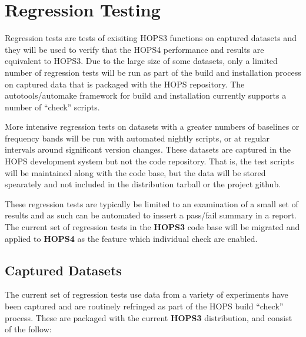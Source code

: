 %
\section{Regression Testing}
\label{sec:regress}

Regression tests are tests of exisiting HOPS3 functions on captured datasets and they will be used to verify that the HOPS4 performance and results are equivalent to HOPS3.  Due to the large size of some datasets, only a limited number of regression tests will be run as part of the build and installation process on captured data that is packaged with the HOPS repository.  The autotools/automake framework for build and installation currently supports a number of ``check'' scripts.

More intensive regression tests on datasets with a greater numbers of baselines or frequency bands will  be run with automated nightly scripts, or at regular intervals around significant version changes. These datasets are captured in the \ac{HOPS} development system but not the code repository.  That is, the test scripts will be maintained along with the code base, but the data will be stored spearately and not included in the distribution tarball or the project github.

These regression tests are typically be limited to an examination of a small set of results and as such can be automated to inssert a pass/fail summary in a report.
The current set of regression tests in the \textbf{HOPS3} code base will be migrated and applied to \textbf{HOPS4} as the feature which individual check are enabled. 



\subsection{Captured Datasets}
\label{sec:captdatareq}

The current set of regression tests use data from a variety of experiments have been captured and are routinely refringed as part of the HOPS build ``check'' process.  
These are packaged with the current \textbf{HOPS3} distribution, and consist of the follow:



